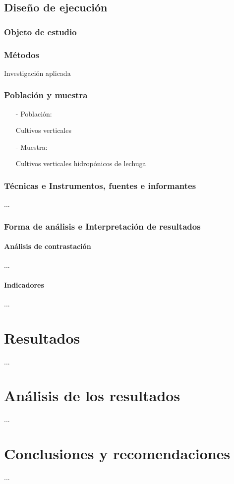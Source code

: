 \documentclass{report}
\begin{document}
\section{Diseño de ejecución}
\subsection{Objeto de estudio}

\subsection{Métodos}
Investigación aplicada
\subsection{Población y muestra}
\begin{enumerate}
\item[-] Población:

  Cultivos verticales
\item[-] Muestra:

  Cultivos verticales hidropónicos de lechuga
\end{enumerate}
\subsection{Técnicas e Instrumentos, fuentes e informantes}
...
\subsection{Forma de análisis e Interpretación de resultados}
\subsubsection{Análisis de contrastación}
...
\subsubsection{Indicadores}
...
\chapter{Resultados}
...
\chapter{Análisis de los resultados}
...
\chapter{Conclusiones y recomendaciones}
...
\end{document}

